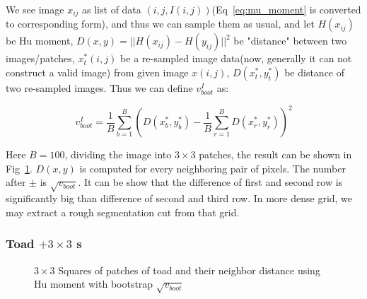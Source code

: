 \documentclass{beamer}
\begin{document}
\begin{frame}
  We see image $x_{ij}$ as list of data $(i,j,I(i,j))$(Eq~\ref{eq:mu_moment} is converted to corresponding form), and thus we can sample them as usual,
  and let $H(x_{ij})$ be Hu moment, $D(x,y)=||H(x_{ij}) - H(y_{ij})||^2$ be "distance" between two images/patches, $x_t^*(i,j)$ be a re-sampled
  image data(now, generally it can not construct a valid image) from given image $x(i,j)$, $D(x_t^*,y_t^*)$ be distance of two re-sampled images. Thus we can define $v_{boot}^I$ as:
  
  $$
  v_{boot}^I = \frac{1}{B}\sum_{b=1}^B \left( D(x_b^*,y_b^*) - \frac{1}{B} \sum_{r=1}^B D(x_r^*,y_r^*) \right)^2
  $$
  
  Here $B=100$, dividing the image into $3 \times 3$ patches, the result can be shown in Fig~\ref{fig:square33}. 
  $D(x,y)$ is computed for every neighboring pair of pixels. The number after $\pm$ is $\sqrt{v_{boot}}$. It can be show that
  the difference of first and second row is significantly big than difference of second and third row. In more dense grid,
  we may extract a rough segmentation cut from that grid.

\end{frame}

\begin{frame}
  \frametitle{Toad $+ 3 \times 3$ s}

  \begin{figure}[htb]
    \centering
    \scalebox{.75}{}
    \caption{$3 \times 3$ Squares of patches of toad and their neighbor distance using Hu moment with bootstrap $\sqrt{v_{boot}}$}
    \label{fig:square33}
  \end{figure}
  

\end{frame}

%
  
\end{document}
